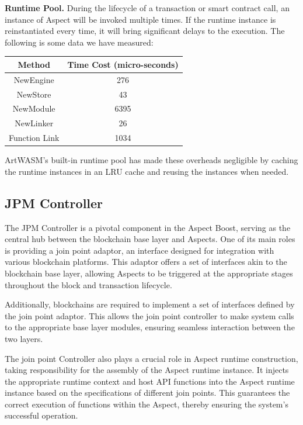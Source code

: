 \textbf{Runtime Pool.} During the lifecycle of a transaction or smart contract call, an instance of Aspect will be invoked multiple times. If the runtime instance is reinstantiated every time, it will bring significant delays to the execution. The following is some data we have measured:

\begin{center}
\begin{tabular}{|c|c|}
  \hline
  Method & Time Cost (micro-seconds) \\
  \hline
  NewEngine & 276 \\
  NewStore & 43 \\
  NewModule & 6395 \\
  NewLinker & 26 \\
  Function Link & 1034 \\
  \hline
\end{tabular}
\end{center}

ArtWASM's built-in runtime pool has made these overheads negligible by caching the runtime instances in an LRU cache and reusing the instances when needed.

\subsection{JPM Controller}

The JPM Controller is a pivotal component in the Aspect Boost, serving as the central hub between the blockchain base layer and Aspects. One of its main roles is providing a join point adaptor, an interface designed for integration with various blockchain platforms. This adaptor offers a set of interfaces akin to the blockchain base layer, allowing Aspects to be triggered at the appropriate stages throughout the block and transaction lifecycle.

Additionally, blockchains are required to implement a set of interfaces defined by the join point adaptor. This allows the join point controller to make system calls to the appropriate base layer modules, ensuring seamless interaction between the two layers.

The join point Controller also plays a crucial role in Aspect runtime construction, taking responsibility for the assembly of the Aspect runtime instance. It injects the appropriate runtime context and host API functions into the Aspect runtime instance based on the specifications of different join points. This guarantees the correct execution of functions within the Aspect, thereby ensuring the system's successful operation.

